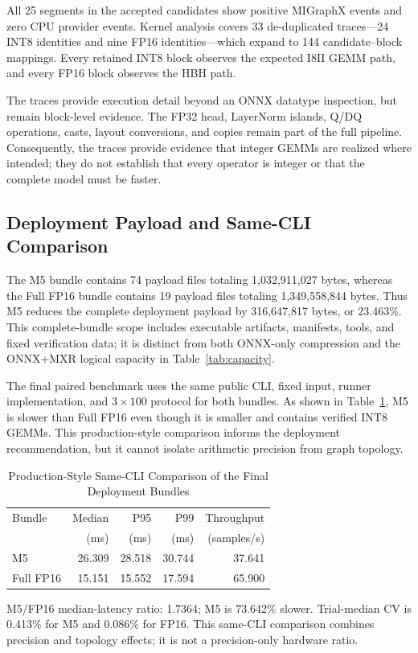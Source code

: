 \documentclass[conference]{IEEEtran}
\begin{document}
All 25 segments in the accepted candidates show positive MIGraphX events and zero CPU provider events. Kernel analysis covers 33 de-duplicated traces---24 INT8 identities and nine FP16 identities---which expand to 144 candidate--block mappings. Every retained INT8 block observes the expected I8II GEMM path, and every FP16 block observes the HBH path.

The traces provide execution detail beyond an ONNX datatype inspection, but remain block-level evidence. The FP32 head, LayerNorm islands, Q/DQ operations, casts, layout conversions, and copies remain part of the full pipeline. Consequently, the traces provide evidence that integer GEMMs are realized where intended; they do not establish that every operator is integer or that the complete model must be faster.

\subsection{Deployment Payload and Same-CLI Comparison}

The M5 bundle contains 74 payload files totaling 1,032,911,027 bytes, whereas the Full FP16 bundle contains 19 payload files totaling 1,349,558,844 bytes. Thus M5 reduces the complete deployment payload by 316,647,817 bytes, or 23.463\%. This complete-bundle scope includes executable artifacts, manifests, tools, and fixed verification data; it is distinct from both ONNX-only compression and the ONNX+MXR logical capacity in Table~\ref{tab:capacity}.

The final paired benchmark uses the same public CLI, fixed input, runner implementation, and $3\times100$ protocol for both bundles. As shown in Table~\ref{tab:cli}, M5 is slower than Full FP16 even though it is smaller and contains verified INT8 GEMMs. This production-style comparison informs the deployment recommendation, but it cannot isolate arithmetic precision from graph topology.

\begin{table}[t]
\caption{Production-Style Same-CLI Comparison of the Final Deployment Bundles}
\label{tab:cli}
\centering
\footnotesize
\begin{tabular}{lrrrr}
\toprule
Bundle & Median & P95 & P99 & Throughput \\
 & (ms) & (ms) & (ms) & (samples/s) \\
\midrule
M5 & 26.309 & 28.518 & 30.744 & 37.641 \\
Full FP16 & 15.151 & 15.552 & 17.594 & 65.900 \\
\bottomrule
\end{tabular}
\vspace{2pt}
\parbox{0.96\columnwidth}{\footnotesize M5/FP16 median-latency ratio: 1.7364; M5 is 73.642\% slower. Trial-median CV is 0.413\% for M5 and 0.086\% for FP16. This same-CLI comparison combines precision and topology effects; it is not a precision-only hardware ratio.}
\end{table}
\end{document}
